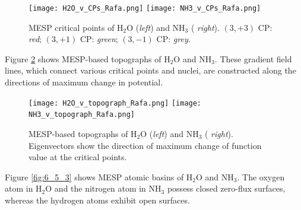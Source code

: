 \documentclass[10pt]{article}
\begin{document}
\begin{figure}[H]
\begin{center}
\vspace*{-3mm}
\texttt{[image: H2O\_v\_CPs\_Rafa.png]}
\hspace*{5mm}
\texttt{[image: NH3\_v\_CPs\_Rafa.png]}
\end{center}
\caption[MESP critical points of H$_2$O and NH$_3$]{MESP critical points of H$_2$O ({\it left}) and NH$_3$ ({\it
right}). $(3,+3)$ CP: {\it red}; $(3,+1)$ CP: {\it green}; $(3,-1)$ CP: {\it grey}.
\label{fig:6_5_1}}
\end{figure}

Figure \ref{fig:6_5_2} shows MESP-based topographs of H$_2$O and NH$_3$. These gradient field lines, which connect various critical points and nuclei, are constructed along the directions of maximum change in potential.


\begin{figure}[H]
\begin{center}
\texttt{[image: H2O\_v\_topograph\_Rafa.png]}
\hspace*{5mm}
\texttt{[image: NH3\_v\_topograph\_Rafa.png]}
\end{center}
\caption[MESP topographs of H$_2$O and NH$_3$]{MESP-based topographs of H$_2$O ({\it left}) and NH$_3$ ({\it
right}). Eigenvectors show the direction of maximum change of function value at the critical points.
\label{fig:6_5_2}}
\end{figure}

Figure \ref{fig:6_5_3} shows MESP atomic basins of H$_2$O and NH$_3$. The oxygen atom in H$_2$O and the nitrogen atom in NH$_3$ 
possess closed zero-flux surfaces, whereas the hydrogen atoms exhibit open surfaces.
 
\end{document}
